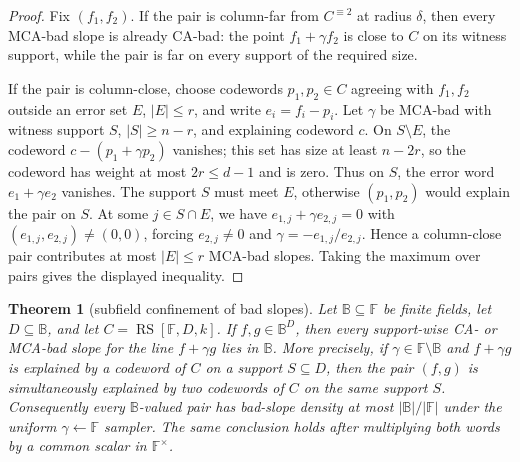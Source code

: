 \documentclass[a4paper,11pt]{amsart}
\newtheorem{theorem}{Theorem}[section]
\theoremstyle{remark}
\newcommand{\F}{\mathbb F}
\newcommand{\B}{\mathbb B}
\newcommand{\RS}{\operatorname{RS}}
\begin{document}
\begin{proof}
Fix \((f_1,f_2)\).  If the pair is column-far from \(C^{\equiv2}\) at radius \(\delta\), then every MCA-bad slope is already CA-bad: the point \(f_1+\gamma f_2\) is close to \(C\) on its witness support, while the pair is far on every support of the required size.

If the pair is column-close, choose codewords \(p_1,p_2\in C\) agreeing with \(f_1,f_2\) outside an error set \(E\), \(|E|\le r\), and write \(e_i=f_i-p_i\).  Let \(\gamma\) be MCA-bad with witness support \(S\), \(|S|\ge n-r\), and explaining codeword \(c\).  On \(S\setminus E\), the codeword \(c-(p_1+\gamma p_2)\) vanishes; this set has size at least \(n-2r\), so the codeword has weight at most \(2r\le d-1\) and is zero.  Thus on \(S\), the error word \(e_1+\gamma e_2\) vanishes.  The support \(S\) must meet \(E\), otherwise \((p_1,p_2)\) would explain the pair on \(S\).  At some \(j\in S\cap E\), we have \(e_{1,j}+\gamma e_{2,j}=0\) with \((e_{1,j},e_{2,j})\ne(0,0)\), forcing \(e_{2,j}\ne0\) and \(\gamma=-e_{1,j}/e_{2,j}\).  Hence a column-close pair contributes at most \(|E|\le r\) MCA-bad slopes.  Taking the maximum over pairs gives the displayed inequality.
\end{proof}

\begin{theorem}[subfield confinement of bad slopes]\label{thm:subfield-confinement}
Let \(\B\subseteq\F\) be finite fields, let \(D\subseteq\B\), and let \(C=\RS[\F,D,k]\).  If \(f,g\in\B^D\), then every support-wise CA- or MCA-bad slope for the line \(f+\gamma g\) lies in \(\B\).  More precisely, if \(\gamma\in\F\setminus\B\) and \(f+\gamma g\) is explained by a codeword of \(C\) on a support \(S\subseteq D\), then the pair \((f,g)\) is simultaneously explained by two codewords of \(C\) on the same support \(S\).  Consequently every \(\B\)-valued pair has bad-slope density at most \(|\B|/|\F|\) under the uniform \(\gamma\leftarrow\F\) sampler.  The same conclusion holds after multiplying both words by a common scalar in \(\F^\times\).
\end{theorem}
\end{document}
